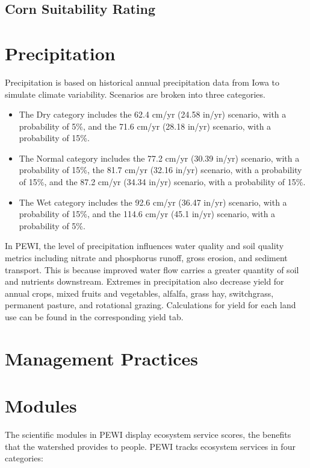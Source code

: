 \documentclass[11pt]{article}
\begin{document}
\subsection{Corn Suitability Rating}


\newpage
\section{Precipitation}
Precipitation is based on historical annual precipitation data from Iowa to simulate climate variability. Scenarios are broken into three categories. 
\begin{itemize}
  \item The Dry category includes the 62.4 cm/yr (24.58 in/yr) scenario, with a probability of 5\%, and the 71.6 cm/yr (28.18 in/yr) scenario, with a probability of 15\%. 
  \item The Normal category includes the 77.2 cm/yr (30.39 in/yr) scenario, with a probability of 15\%, the 81.7 cm/yr (32.16 in/yr) scenario, with a probability of 15\%, and the 87.2 cm/yr (34.34 in/yr) scenario, with a probability of 15\%.
  \item The Wet category includes the 92.6 cm/yr (36.47 in/yr) scenario, with a probability of 15\%, and the 114.6 cm/yr (45.1 in/yr) scenario, with a probability of 5\%.
\end{itemize}

In PEWI, the level of precipitation influences water quality and soil quality metrics including nitrate and phosphorus runoff, gross erosion, and sediment transport. This is because improved water flow carries a greater quantity of soil and nutrients downstream. Extremes in precipitation also decrease yield for annual crops, mixed fruits and vegetables, alfalfa, grass hay, switchgrass, permanent pasture, and rotational grazing.\cite{33}  Calculations for yield for each land use can be found in the corresponding yield tab.


\newpage
\section{Management Practices}


\newpage
\section{Modules}
The scientific modules in PEWI display ecosystem service scores, the benefits that the watershed provides to people. PEWI tracks ecosystem services in four categories: 
\end{document}
